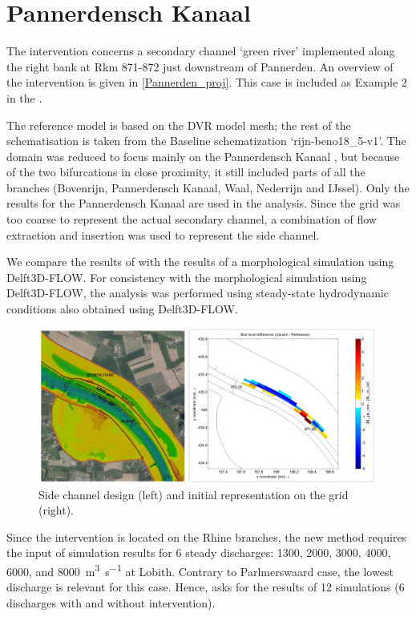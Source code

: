 \section{Pannerdensch Kanaal} \label{Sec:PannerdenschCanal}
The intervention concerns a secondary channel `green river' implemented along the right bank at Rkm 871-872 just downstream of Pannerden.
An overview of the intervention is given in \autoref{Pannerden_proj}.
This case is included as Example 2 in the \citet{um}.

The reference model is based on the DVR model mesh; the rest of the schematisation is taken from the Baseline schematization ‘rijn-beno18\_5-v1’.
The domain was reduced to focus mainly on the Pannerdensch Kanaal \citep{BomLeeuwen2020}, but because of the two bifurcations in close proximity, it still included parts of all the branches (Bovenrijn, Pannerdensch Kanaal, Waal, Nederrijn and IJssel).
Only the results for the Pannerdensch Kanaal are used in the analysis.
Since the grid was too coarse to represent the actual secondary channel, a combination of flow extraction and insertion was used to represent the side channel.

We compare the results of \dfmi with the results of a morphological simulation using Delft3D-FLOW.
For consistency with the morphological simulation using Delft3D-FLOW, the \dfmi analysis was performed using steady-state hydrodynamic conditions also obtained using Delft3D-FLOW.

\begin{figure}
\includegraphics[width=\columnwidth]{figures/Pannerden_proj.png}
\caption{Side channel design (left) and initial representation on the grid (right).}
\label{Pannerden_proj}
\end{figure}

Since the intervention is located on the Rhine branches, the new \dfmi method requires the input of simulation results for 6 steady discharges: 1300, 2000, 3000, 4000, 6000, and \SI{8000}{\metre\cubed\per\second} at Lobith.
Contrary to Parlmerswaard case, the lowest discharge is relevant for this case.
Hence, \dfmi asks for the results of 12 simulations (6 discharges with and without intervention).

